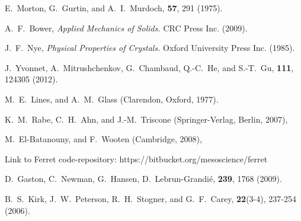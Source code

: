 \documentclass[16pt]{article} %
\begin{document}
\begin{thebibliography}{1}

E.~Morton, G.~Gurtin, and A.~I.~Murdoch, 
 \textbf{57}, 291 (1975).

A.~F.~Bower,
\newblock \emph{Applied Mechanics of Solids.} CRC Press Inc. (2009).

J.~F.~Nye,
\newblock \emph{Physical Properties of Crystals.} Oxford University Press Inc. (1985).

J.~Yvonnet, A.~Mitrushchenkov, G.~Chambaud, Q.-C.~He, and S.-T.~Gu, 
 \textbf{111}, 124305 (2012).

M.~E.~Lines, and A.~M.~Glass 
 (Clarendon, Oxford, 1977).

K.~M.~Rabe, C.~H.~Ahn, and J.-M.~Triscone
 (Springer-Verlag, Berlin, 2007),

M.~El-Batanouny, and F.~Wooten
 (Cambridge, 2008),

Link to Ferret code-repository: https://bitbucket.org/mesoscience/ferret

D.~Gaston, C.~Newman, G.~Hansen, D.~Lebrun-Grandi{\'{e}},
 \textbf{239}, 1768 (2009).

B.~S.~Kirk, J.~W.~Peterson, R.~H.~Stogner, and G.~F.~Carey,
 \textbf{22}(3-4), 237-254 (2006).


\end{thebibliography}
\end{document}
